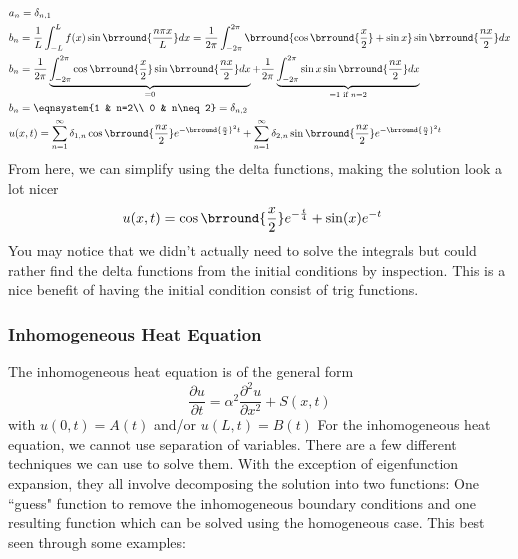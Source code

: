 \begin{align*}
    &a_n=\delta_{n,1}\\
    &b_n=\frac{1}{L}\int_{-L}^L f(x)\sin\brround{\frac{n\pi x}{L}}dx=\frac{1}{2\pi}\int_{-2\pi}^{2\pi}\brround{\cos\brround{\frac{x}{2}}+\sin x}\sin\brround{\frac{nx}{2}}dx\\
    &b_n=\frac{1}{2\pi}\underbrace{\int_{-2\pi}^{2\pi}\cos\brround{\frac{x}{2}}\sin\brround{\frac{nx}{2}}dx}_{=0}+\frac{1}{2\pi}\underbrace{\int_{-2\pi}^{2\pi}\sin x\sin\brround{\frac{nx}{2}}dx}_{=1\text{ if }n=2}\\
    &b_n=\eqnsystem{1 & n=2\\ 0 & n\neq 2}=\delta_{n,2}\\
    &u(x,t)=\sum_{n=1}^\infty\delta_{1,n}\cos\brround{\frac{nx}{2}}e^{-\brround{\frac{n}{2}}^2t}+\sum_{n=1}^\infty\delta_{2,n}\sin\brround{\frac{nx}{2}}e^{-\brround{\frac{n}{2}}^2t}
\end{align*}
From here, we can simplify using the delta functions, making the solution look a lot nicer
\begin{align*}
    &u(x,t)=\cos\brround{\frac{x}{2}}e^{-\frac{t}{4}}+\sin (x)e^{-t}
\end{align*}
You may notice that we didn't actually need to solve the integrals but could rather find the delta functions from the initial conditions by inspection. This is a nice benefit of having the initial condition consist of trig functions.

\subsubsection{Inhomogeneous Heat Equation}
The inhomogeneous heat equation is of the general form
$$\frac{\partial u}{\partial t}=\alpha^2\frac{\partial^2 u}{\partial x^2}+S(x,t)$$
with $u(0,t)=A(t)$ and/or $u(L,t)=B(t)$
For the inhomogeneous heat equation, we cannot use separation of variables. There are a few different techniques we can use to solve them. With the exception of eigenfunction expansion, they all involve decomposing the solution into two functions: One ``guess" function to remove the inhomogeneous boundary conditions and one resulting function which can be solved using the homogeneous case. This best seen through some examples:\\

